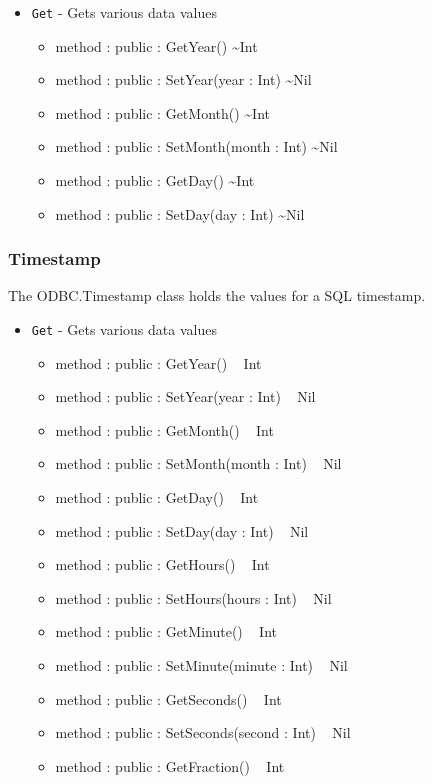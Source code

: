 \documentclass[11pt]{article}
\begin{document}
\begin{itemize}
\item \texttt{Get} - Gets various data values
  \begin{itemize}
  \item method : public : GetYear() \textasciitilde Int
  \item method : public : SetYear(year : Int) \textasciitilde Nil
  \item method : public : GetMonth() \textasciitilde Int
  \item method : public : SetMonth(month : Int) \textasciitilde Nil
  \item method : public : GetDay() \textasciitilde Int
  \item method : public : SetDay(day : Int) \textasciitilde Nil
  \end{itemize}
\end{itemize}

\subsubsection{Timestamp}
The ODBC.Timestamp class holds the values for a SQL timestamp.

\begin{itemize}
\item \texttt{Get} - Gets various data values
  \begin{itemize}
  \item method : public : GetYear() ~ Int 
  \item method : public : SetYear(year : Int) ~ Nil 
  \item method : public : GetMonth() ~ Int 
  \item method : public : SetMonth(month : Int) ~ Nil 
  \item method : public : GetDay() ~ Int 
  \item method : public : SetDay(day : Int) ~ Nil 
  \item method : public : GetHours() ~ Int 
  \item method : public : SetHours(hours : Int) ~ Nil 
  \item method : public : GetMinute() ~ Int 
  \item method : public : SetMinute(minute : Int) ~ Nil 
  \item method : public : GetSeconds() ~ Int 
  \item method : public : SetSeconds(second : Int) ~ Nil 
  \item method : public : GetFraction() ~ Int 
  \end{itemize}
\end{itemize}
\end{document}
